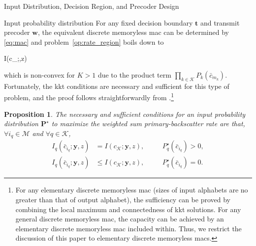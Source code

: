 \documentclass[journal]{IEEEtran}
\newtheorem{proposition}{Proposition}
\begin{document}
\begin{section}{Input Distribution, Decision Region, and Precoder Design}
		\begin{subsection}{Input probability distribution}
			For any fixed decision boundary $\boldsymbol{t}$ and transmit precoder $\boldsymbol{w}$, the equivalent discrete memoryless \gls{mac} can be determined by \eqref{eq:mac} and problem~\eqref{op:rate_region} boils down to
			\begin{maxi!}
				{}{I(c_{};,z)}{\label{op:input_probability_distribution}}{}
				\addConstraint{\eqref{co:sum_probability},\eqref{co:nonnegative_probability},}
			\end{maxi!}
			which is non-convex for $K > 1$ due to the product term $\prod_{k \in \mathcal{K}} P_k(\bar{c}_{m_k})$. Fortunately, the \gls{kkt} conditions are necessary and sufficient for this type of problem, and the proof follows straightforwardly from \cite{Watanabe2009}.\footnote{For any elementary discrete memoryless \gls{mac} (sizes of input alphabets are no greater than that of output alphabet), the sufficiency can be proved by combining the local maximum and connectedness of \gls{kkt} solutions. For any general discrete memoryless \gls{mac}, the capacity can be achieved by an elementary discrete memoryless \gls{mac} included within. Thus, we restrict the discussion of this paper to elementary discrete memoryless \gls{mac}s.}
			\begin{proposition}
				The necessary and sufficient conditions for an input probability distribution $\boldsymbol{P}^{\star}$ to maximize the weighted sum primary-backscatter rate are that, $\forall i_q \in \mathcal{M}$ and $\forall q \in \mathcal{K}$,
				\begin{subequations}
					\begin{alignat}{2}
						I_q(\bar{c}_{i_q};\boldsymbol{y},z) & = I(c_{\mathcal{K}};\boldsymbol{y},z), \quad && P_q^{\star}(\bar{c}_{i_q}) > 0,\label{co:probable_states}\\
						I_q(\bar{c}_{i_q};\boldsymbol{y},z) & \le I(c_{\mathcal{K}};\boldsymbol{y},z), \quad && P_q^{\star}(\bar{c}_{i_q}) = 0.\label{co:dropped_states}
					\end{alignat}
				\end{subequations}


\end{proposition}
\end{subsection}
\end{section}
\end{document}
